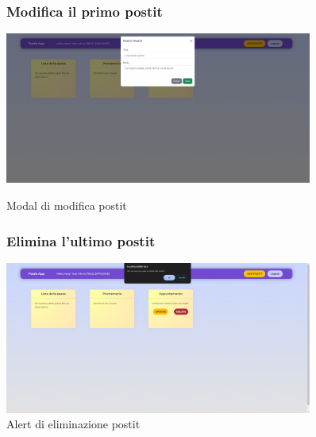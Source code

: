 \vspace*{\fill}
\begin{center}
    \begin{figure}[h]
        \centering
        \subsubsection{Modifica il primo postit}
        \includegraphics[width=0.9\textwidth]{images/5 modifica postit.png}
        \caption{Modal di modifica postit}
         \subsubsection{Elimina l'ultimo postit}
        \includegraphics[width=0.9\textwidth]{images/6 eliminazione postit.png}
        \caption{Alert di eliminazione postit}
        \label{fig:enter-label}
    \end{figure}
\end{center}
\vspace*{\fill}

\newpage

